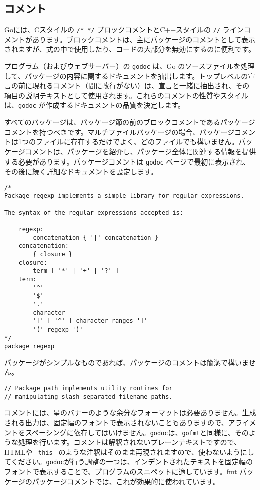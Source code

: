 \documentclass{jsarticle}
\begin{document}
\subsection{コメント}

Goには、Cスタイルの \texttt{/*\ */} ブロックコメントとC++スタイルの
\texttt{//}
ラインコメントがあります。ブロックコメントは、主にパッケージのコメントとして表示されますが、式の中で使用したり、コードの大部分を無効にするのに便利です。

プログラム（およびウェブサーバー）の \texttt{godoc} は、Go
のソースファイルを処理して、パッケージの内容に関するドキュメントを抽出します。トップレベルの宣言の前に現れるコメント（間に改行がない）は、宣言と一緒に抽出され、その項目の説明テキストとして使用されます。これらのコメントの性質やスタイルは、\texttt{godoc}
が作成するドキュメントの品質を決定します。

すべてのパッケージは、パッケージ節の前のブロックコメントであるパッケージコメントを持つべきです。マルチファイルパッケージの場合、パッケージコメントは1つのファイルに存在するだけでよく、どのファイルでも構いません。パッケージコメントは、パッケージを紹介し、パッケージ全体に関連する情報を提供する必要があります。パッケージコメントは
\texttt{godoc}
ページで最初に表示され、その後に続く詳細なドキュメントを設定します。

\begin{lstlisting}[numbers=none]
/*
Package regexp implements a simple library for regular expressions.

The syntax of the regular expressions accepted is:

    regexp:
        concatenation { '|' concatenation }
    concatenation:
        { closure }
    closure:
        term [ '*' | '+' | '?' ]
    term:
        '^'
        '$'
        '.'
        character
        '[' [ '^' ] character-ranges ']'
        '(' regexp ')'
*/
package regexp
\end{lstlisting}

パッケージがシンプルなものであれば、パッケージのコメントは簡潔で構いません。

\begin{lstlisting}[numbers=none]
// Package path implements utility routines for
// manipulating slash-separated filename paths.
\end{lstlisting}

コメントには、星のバナーのような余分なフォーマットは必要ありません。生成される出力は、固定幅のフォントで表示されないこともありますので、アライメントをスペーシングに依存してはいけません。\texttt{godoc}は、\texttt{gofmt}と同様に、そのような処理を行います。コメントは解釈されないプレーンテキストですので、HTMLや
\texttt{\_this\_}
のような注釈はそのまま再現されますので、使わないようにしてください。\texttt{godoc}が行う調整の一つは、インデントされたテキストを固定幅のフォントで表示することで、プログラムのスニペットに適しています。{fmt
パッケージ}のパッケージコメントでは、これが効果的に使われています。
\end{document}
